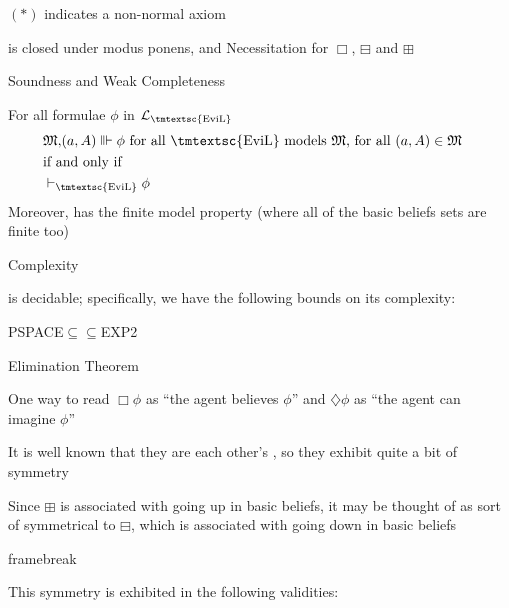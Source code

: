 $(\ast)$ indicates a non-normal axiom

 is closed under modus ponens, and Necessitation for $\Box $,
$\boxminus$ and $\boxplus$



 Soundness and Weak Completeness

For all formulae $\phi$ in $\mathcal{L}_{\text{\tmtextsc{EviL}}}$
\begin{eqnarray*}
  & \mathfrak{M,} (a, A) \Vvdash \phi \text{ for all \tmtextsc{EviL} models
  $\mathfrak{M}$, for all $(a, A) \in \mathfrak{M}$} & \\
  & \text{if and only if} & \\
  & \vdash_{\text{\tmtextsc{EviL}}} \phi & 
\end{eqnarray*}
Moreover,  has the finite model property (where all of the
basic beliefs sets are finite too)



Complexity

 is decidable; specifically, we have the following bounds on
its complexity:

\begin{center}
  PSPACE$\subseteq$$\subseteq$EXP2
\end{center}



Elimination Theorem

One way to read $\Box  \phi$ as ``the agent believes $\phi$'' and $\diamondsuit
\phi$ as ``the agent can imagine $\phi$''

It is well known that they are each other's , so they exhibit
quite a bit of symmetry

Since $\boxplus$ is associated with going up in basic beliefs, it may be
thought of as sort of symmetrical to $\boxminus$, which is associated with
going down in basic beliefs

framebreak

This symmetry is exhibited in the following validities:

